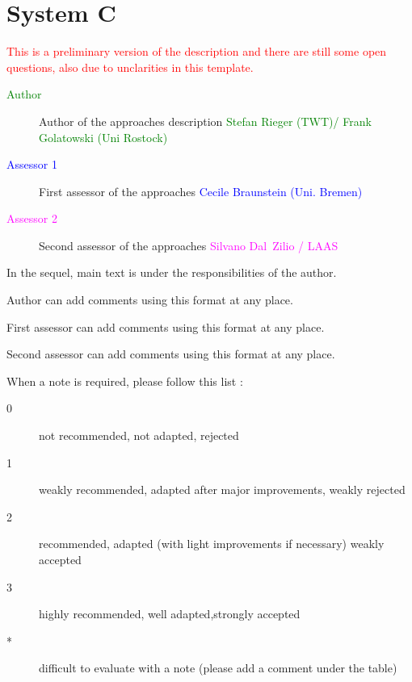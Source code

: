 
\chapter{System C}

\textcolor{red}{
This is a preliminary version of the description and there are still some open questions, also due to unclarities in this template.
}

\begin{description}
\item[\textcolor{green}{Author}] Author of the approaches description \textcolor{green}{Stefan Rieger (TWT)/ Frank Golatowski (Uni Rostock)}
\item[\textcolor{blue}{Assessor 1}] First assessor of the approaches \textcolor{blue}{Cecile Braunstein (Uni. Bremen)}
\item[\textcolor{magenta}{Assessor 2}] Second assessor of the approaches \textcolor{magenta}{Silvano Dal~Zilio / LAAS}
\end{description}

In the sequel, main text is under the responsibilities of the author.

\begin{author_comment}
Author can add comments using this format at any place.
\end{author_comment}

\begin{assessor1}
First assessor can add comments using this format at any place.
\end{assessor1}

\begin{assessor2}
Second assessor can add comments using this format at any place.
\end{assessor2}

When a note is required, please follow this list :
\begin{description}
\item[0] not recommended, not adapted, rejected
\item[1] weakly recommended, adapted after major improvements, weakly rejected
\item[2] recommended, adapted (with light improvements if necessary) weakly accepted
\item[3] highly recommended, well adapted,strongly accepted
\item[*] difficult to evaluate with a note (please add a comment under the table)
\end{description}

